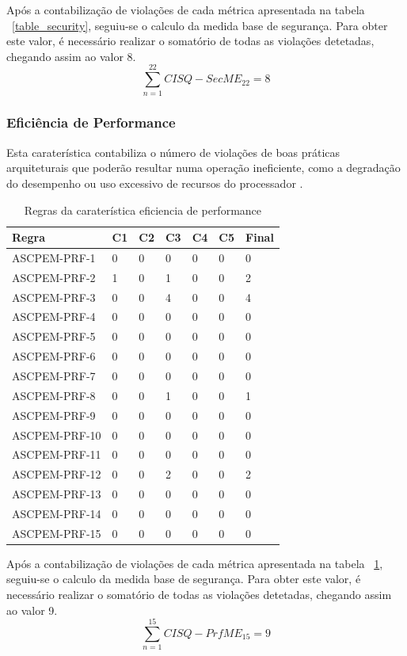 \documentclass[openany,10pt,a4paper]{article}
\begin{document}
Após a contabilização de violações de cada métrica apresentada na tabela ~\ref{table_security}, seguiu-se o calculo da medida base de segurança. Para obter este valor, é necessário realizar o somatório de todas as violações detetadas, chegando assim ao valor 8.
$$\sum_{n=1}^{22} CISQ - SecME_{22} = 8$$

\subsubsection{Eficiência de Performance}
Esta caraterística contabiliza o número de violações de boas práticas arquiteturais que poderão resultar numa operação ineficiente, como a degradação do desempenho ou uso excessivo de recursos do processador \cite{OMG_Performance}.
\begin{longtable}{|p{1.3in}|p{0.28in}|p{0.28in}|p{0.28in}|p{0.28in}|p{0.28in}|p{0.35in}|}
	\caption{Regras da caraterística eficiencia de performance}
	\label{table_performance}
	\endhead
	\hline	
	\textbf{Regra} & \textbf{C1} & \textbf{C2} & \textbf{C3} & \textbf{C4} & \textbf{C5} & \textbf{Final} \\ \hline
ASCPEM-PRF-1 & 0 & 0 & 0 & 0 & 0 & 0 \\ \hline
ASCPEM-PRF-2 & 1 & 0 & 1 & 0 & 0 & 2 \\ \hline
ASCPEM-PRF-3 & 0 & 0 & 4 & 0 & 0 & 4 \\ \hline
ASCPEM-PRF-4 & 0 & 0 & 0 & 0 & 0 & 0 \\ \hline
ASCPEM-PRF-5 & 0 & 0 & 0 & 0 & 0 & 0 \\ \hline
ASCPEM-PRF-6 & 0 & 0 & 0 & 0 & 0 & 0 \\ \hline
ASCPEM-PRF-7 & 0 & 0 & 0 & 0 & 0 & 0 \\ \hline
ASCPEM-PRF-8 & 0 & 0 & 1 & 0 & 0 & 1 \\ \hline
ASCPEM-PRF-9 & 0 & 0 & 0 & 0 & 0 & 0 \\ \hline
ASCPEM-PRF-10 & 0 & 0 & 0 & 0 & 0 & 0 \\ \hline
ASCPEM-PRF-11 & 0 & 0 & 0 & 0 & 0 & 0 \\ \hline
ASCPEM-PRF-12 & 0 & 0 & 2 & 0 & 0 & 2 \\ \hline
ASCPEM-PRF-13 & 0 & 0 & 0 & 0 & 0 & 0 \\ \hline
ASCPEM-PRF-14 & 0 & 0 & 0 & 0 & 0 & 0 \\ \hline
ASCPEM-PRF-15 & 0 & 0 & 0 & 0 & 0 & 0 \\ \hline
	\end{longtable} 

Após a contabilização de violações de cada métrica apresentada na tabela ~\ref{table_performance}, seguiu-se o calculo da medida base de segurança. Para obter este valor, é necessário realizar o somatório de todas as violações detetadas, chegando assim ao valor 9.
$$\sum_{n=1}^{15} CISQ - PrfME_{15} = 9$$
\end{document}

